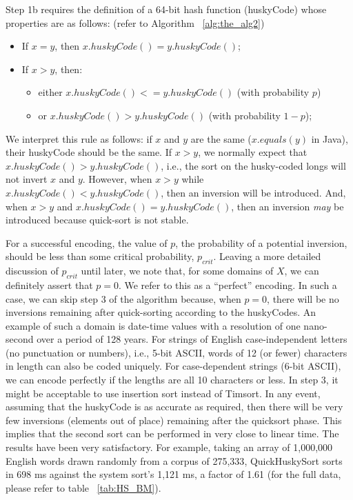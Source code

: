 \documentclass[twoside,leqno,twocolumn]{article}
\begin{document}
Step 1b requires the definition of a 64-bit hash function (huskyCode) whose properties are as follows:
(refer to Algorithm ~\ref{alg:the_alg2})
\begin{itemize}
                        \item {}If $x = y$, then $x.huskyCode() = y.huskyCode()$;
                        \item {}If $x > y$, then: 
                            \begin{itemize}
                            \item{} either $x.huskyCode() <= y.huskyCode()$ (with probability $p$)
                            \item{} or $x.huskyCode() > y.huskyCode()$ (with probability $1-p$);
                            
                            \end{itemize}
                        
                        \end{itemize}


We interpret this rule as follows:
if $x$ and $y$ are the same ($x.equals(y)$ in Java), their huskyCode should be the same.
If $x > y$, we normally expect that $x.huskyCode() > y.huskyCode()$, i.e., the sort on the husky-coded longs will not invert $x$ and $y$.
However, when $x > y$ while $x.huskyCode() < y.huskyCode()$, then an inversion will be introduced.
And, when $x > y$ and $x.huskyCode() = y.huskyCode()$, then an inversion \emph{may} be introduced because quick-sort is not stable.\cite{6115063}

For a successful encoding, the value of $p$, the probability of a potential inversion, should be less than some critical probability, $p_{crit}$.
Leaving a more detailed discussion of $p_{crit}$ until later, we note that, for some domains of $X$, we can definitely assert that $p = 0$.
We refer to this as a “perfect” encoding.
In such a case, we can skip step 3 of the algorithm because, when $p = 0$, there will be no inversions remaining after quick-sorting according to the huskyCodes.
An example of such a domain is date-time values with a resolution of one nano-second over a period of 128 years.
For strings of English case-independent letters (no punctuation or numbers), i.e., 5-bit ASCII, words of 12 (or fewer) characters in length can also be coded uniquely.
For case-dependent strings (6-bit ASCII), we can encode perfectly if the lengths are all 10 characters or less.
In step 3, it might be acceptable to use insertion sort instead of Timsort.
In any event, assuming that the huskyCode is as accurate as required, then there will be very few inversions (elements out of place) remaining after the quicksort phase.
This implies that the second sort can be performed in very close to linear time.
The results have been very satisfactory.
For example, taking an array of 1,000,000 English words drawn randomly from a corpus of 275,333\cite{GOLDHAHN12.327},
QuickHuskySort sorts in 698 ms against the system sort's 1,121 ms, a factor of 1.61
(for the full data, please refer to table ~\ref{tab:HS_BM}).
\end{document}
